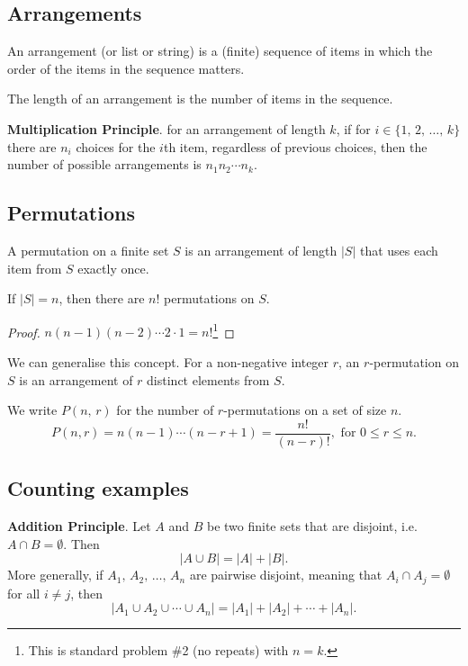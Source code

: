 \documentclass[10pt, a4paper]{article}
\begin{document}
\subsection{Arrangements}
An arrangement (or list or string) is a (finite) sequence of items in which the order of the items in the sequence matters.

The length of an arrangement is the number of items in the sequence.

\textbf{Multiplication Principle}. for an arrangement of length $k$, if for $i \in \{1,\,2,\,\dotsc,\,k\}$ there are $n_i$ choices for the $i$th item, regardless of previous choices, then the number of possible arrangements is $n_1n_2\dotsi n_k$.

\subsection{Permutations}
A permutation on a finite set $S$ is an arrangement of length $|S|$ that uses each item from $S$ exactly once.

\begin{proposition}
    If $|S| = n$, then there are $n!$ permutations on $S$.
    
    \begin{proof}
        $n(n - 1)(n - 2)\dotsi 2 \cdot 1 = n!$\footnote{This is standard problem \#2 (no repeats) with $n = k$.}
    \end{proof}
\end{proposition}

We can generalise this concept. For a non-negative integer $r$, an $r$-permutation on $S$ is an arrangement of $r$ distinct elements from $S$.

We write $P(n,\,r)$ for the number of $r$-permutations on a set of size $n$.
\[
P(n, r) = n(n - 1)\dotsi (n - r + 1) = \frac{n!}{(n - r)!}, \text{ for } 0 \leq r \leq n.
\]

\subsection{Counting examples}

\textbf{Addition Principle}. Let $A$ and $B$ be two finite sets that are disjoint, i.e. $A \cap B = \emptyset$. Then
\[
|A \cup B| = |A| + |B|.
\]
More generally, if $A_1,\,A_2,\,\dotsc,\,A_n$ are pairwise disjoint, meaning that $A_i \cap A_j = \emptyset$ for all $i \neq j$, then
\[
|A_1 \cup A_2 \cup \dotsi \cup A_n| = |A_1| + |A_2| + \dotsi + |A_n|.
\]
\end{document}
